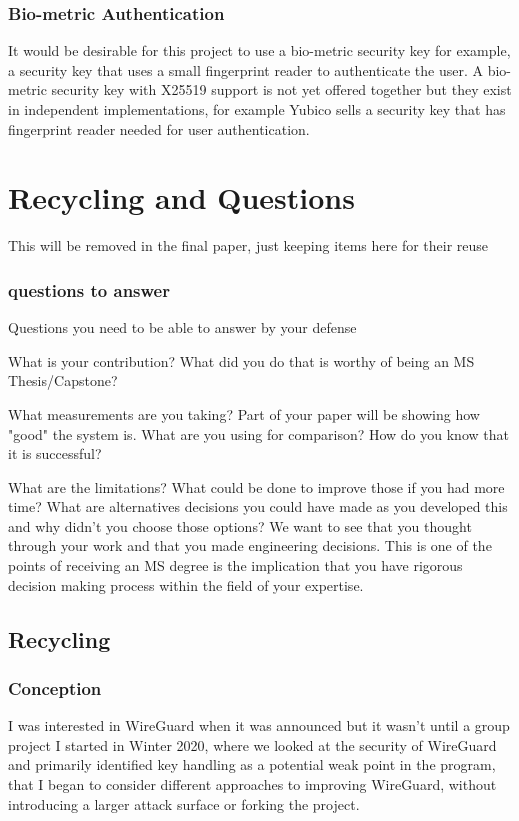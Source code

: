\documentclass [11pt, proquest] {uwthesis}[2020/02/24]
\begin{document}
\subsection{Bio-metric Authentication}
It would be desirable for this project to use a bio-metric security key for example, a security key that uses a small fingerprint reader to authenticate the user. A bio-metric security key with X25519 support is not yet offered together but they exist in independent implementations, for example Yubico sells a security key that has fingerprint reader needed for user authentication\cite{yubico_yubikey_2022}. 

\chapter{Recycling and Questions}
This will be removed in the final paper, just keeping items here for their reuse

\subsection{questions to answer}
Questions you need to be able to answer by your defense

    What is your contribution? What did you do that is worthy of being an MS Thesis/Capstone?

    What measurements are you taking? Part of your paper will be showing how "good" the system is. What are you using for comparison? How do you know that it is successful?

    What are the limitations? What could be done to improve those if you had more time? 
    What are alternatives decisions you could have made as you developed this and why didn't you choose those options? 
    We want to see that you thought through your work and that you made engineering decisions. 
        This is one of the points of receiving an MS degree is the implication that you have rigorous decision making process within the field of your expertise.
        
\section{Recycling}

\subsection {Conception}
I was interested in WireGuard when it was announced but it wasn't until a group project I started in Winter 2020, where we looked at the security of WireGuard and primarily identified key handling as a potential weak point in the program, that I began to consider different approaches to improving WireGuard,  without introducing a larger attack surface or forking the project. 
\end{document}

